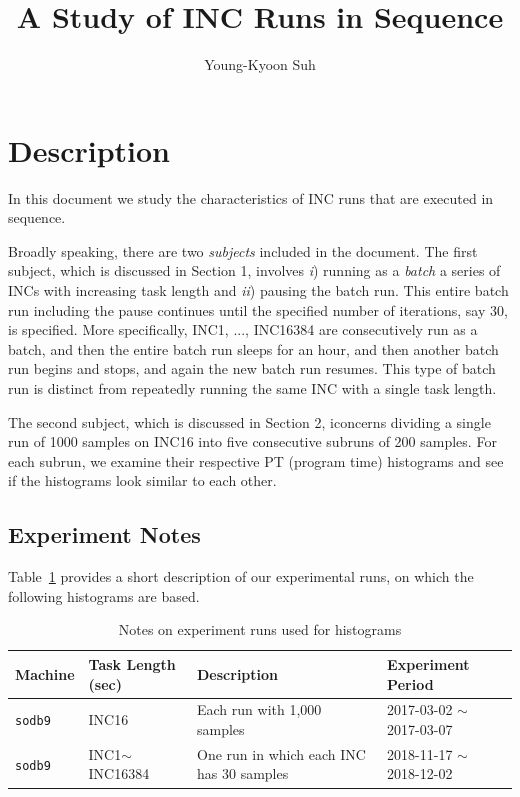 \documentclass[10pt]{article}
\begin{document}
\title{A Study of INC Runs in Sequence}

\author{
Young-Kyoon Suh\\
}
\maketitle

\section{Description}
In this document we study the characteristics of INC runs that are executed in sequence. 

Broadly speaking, there are two {\em subjects} included in the document.
The first subject, which is discussed in Section 1, involves {\it i}) running as a {\em batch} a series of INCs with increasing task length and {\it ii}) pausing the batch run. This entire batch run including the pause continues until the specified number of iterations, say 30, is specified. More specifically, INC1, ..., INC16384 are consecutively run as a batch, and 
then the entire batch run sleeps for an hour, and then another batch run begins and stops, and again the new batch run resumes. This type of batch run is distinct from repeatedly running the same INC with a single task length.

The second subject, which is discussed in Section 2, iconcerns dividing 
a single run of 1000 samples on INC16 into five consecutive subruns of 200 samples.  
For each subrun, we examine their respective PT (program time) histograms 
and see if the histograms look similar to each other. 

\subsection{Experiment Notes}
Table~\ref{tab:exp_notes} provides a short description of our experimental runs, 
on which the following histograms are based.

\begin{table}[h]
\begin{center}
\begin{tabular}{|p{2cm}|p{3cm}|p{6cm}|p{4cm}|} \hline
Machine & Task Length (sec) & Description & Experiment Period\\ \hline
{\tt sodb9} &  INC16 & Each run with 1,000 samples & 2017-03-02 $\sim$ 2017-03-07\\ \hline
{\tt sodb9} &  INC1$\sim$INC16384 & One run in which each INC has 30 samples & 2018-11-17 $\sim$ 2018-12-02\\ \hline
\end{tabular}
\end{center}
\vspace{-.2in}
\caption{Notes on experiment runs used for histograms\label{tab:exp_notes}}
\end{table}
\end{document}
